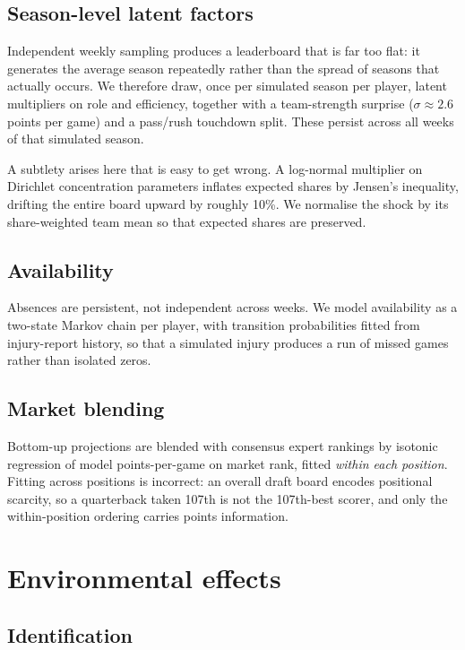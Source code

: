 \documentclass[11pt,a4paper]{article}
\begin{document}
\subsection{Season-level latent factors}

Independent weekly sampling produces a leaderboard that is far too flat: it
generates the average season repeatedly rather than the spread of seasons that
actually occurs. We therefore draw, once per simulated season per player, latent
multipliers on role and efficiency, together with a team-strength surprise
($\sigma \approx 2.6$ points per game) and a pass/rush touchdown split. These
persist across all weeks of that simulated season.

A subtlety arises here that is easy to get wrong. A log-normal multiplier on
Dirichlet concentration parameters inflates expected shares by Jensen's
inequality, drifting the entire board upward by roughly 10\%. We normalise the
shock by its share-weighted team mean so that expected shares are preserved.

\subsection{Availability}

Absences are persistent, not independent across weeks. We model availability as
a two-state Markov chain per player, with transition probabilities fitted from
injury-report history, so that a simulated injury produces a run of missed games
rather than isolated zeros.

\subsection{Market blending}

Bottom-up projections are blended with consensus expert rankings by isotonic
regression of model points-per-game on market rank, fitted \emph{within each
position}. Fitting across positions is incorrect: an overall draft board encodes
positional scarcity, so a quarterback taken 107th is not the 107th-best scorer,
and only the within-position ordering carries points information.

\section{Environmental effects}
\label{sec:environment}

\subsection{Identification}
\end{document}
